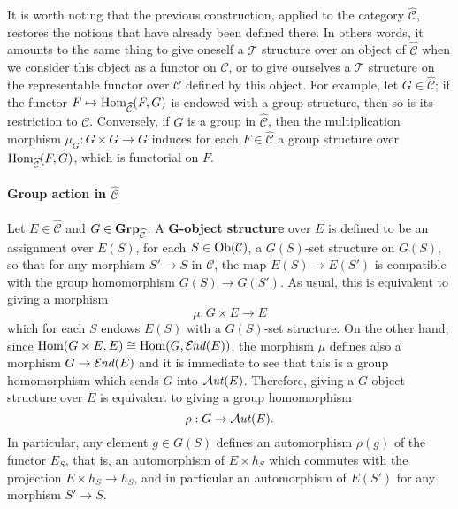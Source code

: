 \begin{remark}
It is worth noting that the previous construction, applied to the category $\widehat{\mathcal{C}}$, restores the notions that have already been defined there. In others words, it amounts to the same thing to give oneself a $\mathcal{T}$ structure over an object of $\widehat{\mathcal{C}}$ when we consider this object as a functor on $\mathcal{C}$, or to give ourselves a $\mathcal{T}$ structure on the representable functor over $\mathcal{C}$ defined by this object. For example, let $G\in\widehat{\mathcal{C}}$; if the functor $F\mapsto\mathrm{Hom}_{\widehat{\mathcal{C}}}(F,G)$ is endowed with a group structure, then so is its restriction to $\mathcal{C}$. Conversely, if $G$ is a group in $\widehat{\mathcal{C}}$, then the multiplication morphism $\mu_G:G\times G\to G$ induces for each $F\in\widehat{\mathcal{C}}$ a group structure over $\mathrm{Hom}_{\widehat{\mathcal{C}}}(F,G)$, which is functorial on $F$.
\end{remark}

\paragraph{Group action in \texorpdfstring{$\widehat{\mathcal{C}}$}{PSh}}\label{category group action in PSh paragraph}
Let $E\in\widehat{\mathcal{C}}$ and $G\in\mathbf{Grp}_{\widehat{\mathcal{C}}}$. A \textbf{$\bm{G}$-object structure} over $E$ is defined to be an assignment over $E(S)$, for each $S\in\mathrm{Ob}(\mathcal{C})$, a $G(S)$-set structure on $G(S)$, so that for any morphism $S'\to S$ in $\mathcal{C}$, the map $E(S)\to E(S')$ is compatible with the group homomorphism $G(S)\to G(S')$. As usual, this is equivalent to giving a morphism
\[\mu:G\times E\to E\]
which for each $S$ endows $E(S)$ with a $G(S)$-set structure. On the other hand, since $\mathrm{Hom}(G\times E,E)\cong\mathrm{Hom}(G,\operatorname{\mathcal{E}\hspace*{-1pt}\textit{nd}\hspace{0.5pt}}(E))$, the morphism $\mu$ defines also a morphism $G\to\operatorname{\mathcal{E}\hspace*{-1pt}\textit{nd}\hspace{0.5pt}}(E)$ and it is immediate to see that this is a group homomorphism which sends $G$ into $\operatorname{\mathcal{A}\hspace*{-0.2pt}\textit{ut}\hspace{0.5pt}}(E)$. Therefore, giving a $G$-object structure over $E$ is equivalent to giving a group homomorphism
\[\rho:G\to\operatorname{\mathcal{A}\hspace*{-0.2pt}\textit{ut}\hspace{0.5pt}}(E).\]
In particular, any element $g\in G(S)$ defines an automorphism $\rho(g)$ of the functor $E_S$, that is, an automorphism of $E\times h_S$ which commutes with the projection $E\times h_S\to h_S$, and in particular an automorphism of $E(S')$ for any morphism $S'\to S$.

